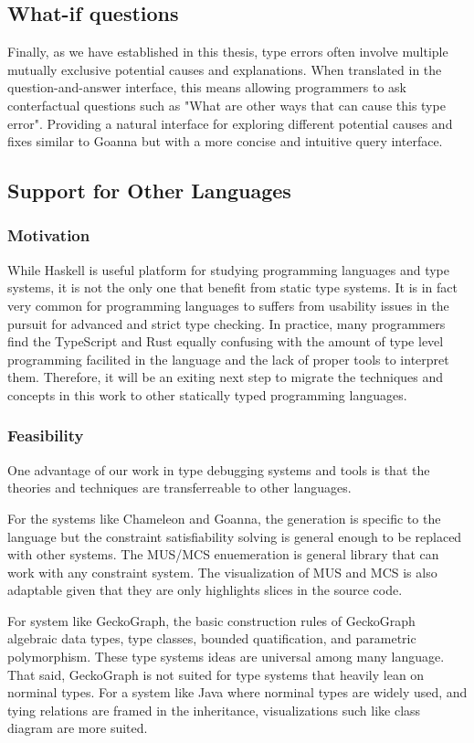 \subsection{What-if questions}
Finally, as we have established in this thesis, type errors often involve multiple mutually exclusive potential causes and explanations. When translated in the question-and-answer interface, this means allowing programmers to ask conterfactual questions such as "What are other ways that can cause this type error". Providing a natural interface for exploring different potential causes and fixes similar to Goanna but with a more concise and intuitive query interface.

\subsection{Support for Other Languages}
\subsubsection{Motivation}
While Haskell is useful platform for studying programming languages and type systems, it is not the only one that benefit from static type systems. It is in fact very common for programming languages to suffers from usability issues in the pursuit for advanced and strict type checking. In practice, many programmers find the TypeScript and Rust equally confusing with the amount of type level programming facilited in the language and the lack of proper tools to interpret them. Therefore, it will be an exiting next step to migrate the techniques and concepts in this work to other statically typed programming languages. 

\subsubsection{Feasibility}

One advantage of our work in type debugging systems and tools is that the theories and techniques are transferreable to other languages.  

For the systems like Chameleon and Goanna, the generation is specific to the language but the constraint satisfiability solving is general enough to be replaced with other systems. The MUS/MCS enuemeration is general library that can work with any constraint system. The visualization of MUS and MCS is also adaptable given that they are only highlights slices in the source code.

For system like GeckoGraph, the basic construction rules of GeckoGraph algebraic data types, type classes, bounded quatification, and parametric polymorphism. These type systems ideas are universal among many language. That said, GeckoGraph is not suited for type systems that heavily lean on norminal types. For a system like Java where norminal types are widely used, and tying relations are framed in the inheritance, visualizations such like class diagram are more suited. 




